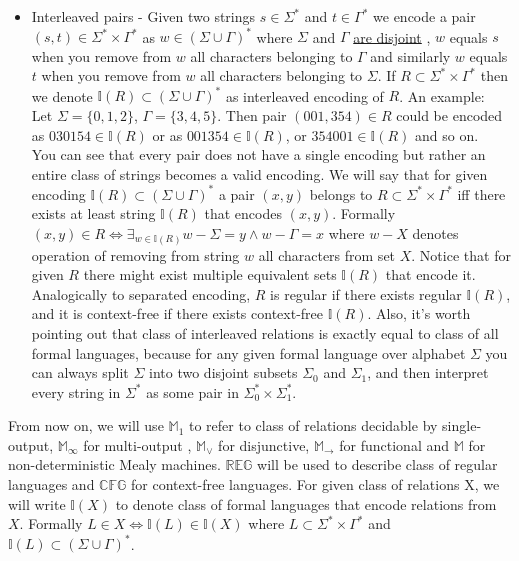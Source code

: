 \documentclass[12pt]{article}
\begin{document}
\begin{itemize}
	\item Interleaved pairs - Given two strings $s \in \Sigma^*$ and $t \in \Gamma^*$ we encode a pair $(s,t) \in \Sigma^* \times \Gamma^*$ as $w \in (\Sigma \cup \Gamma)^* $ where $\Sigma$ and $\Gamma$ \underline{are disjoint} , $w$ equals $s$ when you remove from $w$ all characters belonging to $\Gamma$ and similarly $w$ equals $t$ when you remove from $w$ all characters belonging to $\Sigma$. If $R \subset  \Sigma^* \times \Gamma^*$ then we denote $\mathbb{I}(R) \subset (\Sigma \cup \Gamma)^*$ as interleaved encoding of $R$. An example:\\
	Let $\Sigma = \{0,1,2\}$, $\Gamma = \{3,4,5\}$. Then pair $(001,354) \in R$ could be encoded as $030154 \in \mathbb{I}(R)$ or as $001354 \in \mathbb{I}(R)$, or $354001 \in \mathbb{I}(R)$ and so on. \\
	You can see that every pair does not have a single encoding but rather an entire class of strings becomes a valid encoding. We will say that for given encoding $\mathbb{I}(R) \subset (\Sigma \cup \Gamma)^*$ a pair $(x,y)$ belongs to $R \subset \Sigma^* \times \Gamma^*$ iff there exists at least string $\mathbb{I}(R)$ that encodes $(x,y)$. Formally $(x,y) \in R \iff \exists_{w\in\mathbb{I}(R)} w - \Sigma = y \wedge w - \Gamma = x$ where $w-X$ denotes operation of removing from string $w$ all characters from set $X$. Notice that for given $R$ there might exist multiple equivalent sets $\mathbb{I}(R)$ that encode it. Analogically to separated encoding, $R$ is regular if there exists regular $\mathbb{I}(R)$, and it is context-free if there exists context-free $\mathbb{I}(R)$. Also, it's worth pointing out that class of interleaved relations is exactly equal to class of all formal languages, because for any given formal language over alphabet $\Sigma$ you can always split $\Sigma$ into two disjoint subsets $\Sigma_0$ and $\Sigma_1$, and then interpret every string in $\Sigma^*$ as some pair in $\Sigma_0^* \times \Sigma_1^*$.
\end{itemize}
 
From now on, we will use $\mathbb{M}_1$ to refer to class of relations decidable by single-output, $\mathbb{M}_\infty$ for multi-output , $\mathbb{M}_\vee$ for disjunctive, $\mathbb{M}_\rightarrow$ for functional and $\mathbb{M}$ for non-deterministic Mealy machines. $\mathbb{REG}$ will be used to describe class of regular languages  and $\mathbb{CFG}$ for context-free languages. For given class of relations X, we will write $\mathbb{I}(X)$ to denote class of formal languages that encode relations from $X$. Formally $L  \in X \iff \mathbb{I}(L)  \in \mathbb{I}(X)$ where $L \subset \Sigma^* \times \Gamma^*$ and $\mathbb{I}(L) \subset (\Sigma \cup \Gamma)^*$. 
 
\end{document}
